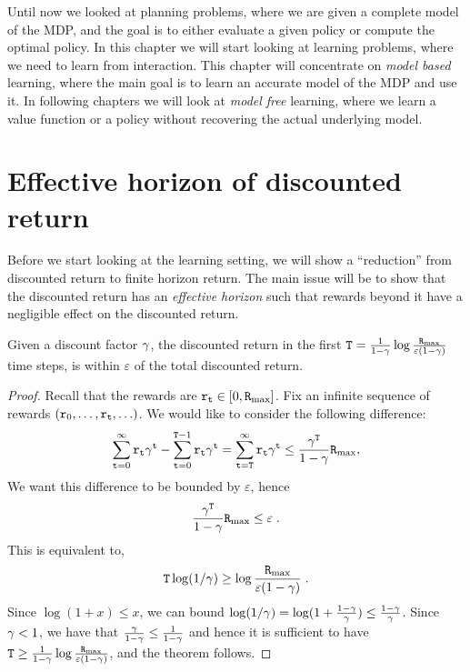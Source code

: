 Until now we looked at planning problems, where we are given a
complete model of the MDP, and the goal is to either evaluate a
given policy or compute the optimal policy. In this chapter we will
start looking at learning problems, where we need to learn from
interaction. This chapter will concentrate on {\em model based}
learning, where the main goal is to learn an accurate model of the
MDP and use it. In following chapters we will look at {\em model
free} learning, where we learn a value function or a policy without
recovering the actual underlying model.

\section{Effective horizon of discounted return}

Before we start looking at the learning setting, we will show a
``reduction'' from discounted return to finite horizon return. The
main issue will be to show that the discounted return has an {\em
effective horizon} such that rewards beyond it have a negligible
effect on the discounted return.

\begin{theorem}
\label{thm:disc-effective-horizon}
%
Given a discount factor $\gamma$, the discounted
return in the first ${\tt T}=\frac{1}{1-\gamma}\log
\frac{{\tt R}_{\max }}{\varepsilon(1-\gamma)}$ time steps, is within
$\varepsilon$ of the total discounted return.
\end{theorem}

\begin{proof}
Recall that the rewards are ${\tt r}_{\tt t} \in [0,{\tt R}_{\max }]$. Fix an
infinite sequence of rewards $({\tt r}_0, \ldots , {\tt r}_{\tt t},
\ldots)$. We would like to consider the following difference:
\begin{align*}
\sum_{{\tt t}=0}^\infty {\tt r}_{\tt t} \gamma^{\tt t} -
\sum_{{\tt t}=0}^{{\tt T}-1} {\tt r}_{\tt t} \gamma^{\tt t} =
\sum_{{\tt t}={\tt T}}^\infty {\tt r}_{\tt t} \gamma^{\tt t} \leq
\frac{\gamma^{\tt T}}{1-\gamma}{\tt R}_{\max },
\end{align*}
We want this difference to be bounded by $\varepsilon$, hence
\[
\frac{\gamma^{\tt T}}{1-\gamma}{\tt R}_{\max }\leq \varepsilon\;.
\]
This is equivalent to,
\[
{\tt T}\log (1/\gamma) \geq \log
\frac{{\tt R}_{\max }}{\varepsilon(1-\gamma)}\;.
\]
Since $\log(1+x)\leq x$, we can bound $\log (1/\gamma)= \log (
1+\frac{1-\gamma}{\gamma} )\leq
\frac{1-\gamma}{\gamma}$. Since $\gamma< 1$, we have that
$\frac{\gamma}{1-\gamma} \leq \frac{1}{1-\gamma}$ and hence
it is sufficient to have ${\tt T}\geq \frac{1}{1-\gamma}\log
\frac{{\tt R}_{\max }}{\varepsilon(1-\gamma)} $, and the theorem follows.
\end{proof}

